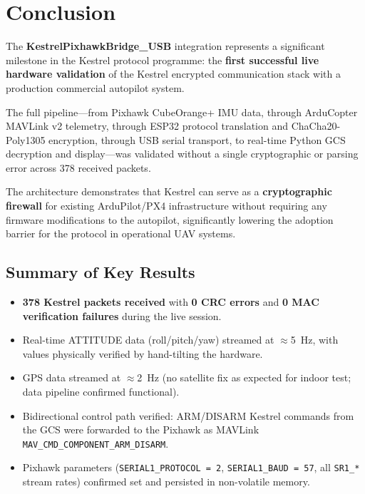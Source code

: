 \documentclass[11pt,a4paper]{article}
\begin{document}
\section{Conclusion}

The \textbf{KestrelPixhawkBridge\_USB} integration represents a significant
milestone in the Kestrel protocol programme: the \textbf{first successful
live hardware validation} of the Kestrel encrypted communication stack with
a production commercial autopilot system.

The full pipeline---from Pixhawk CubeOrange+ IMU data, through ArduCopter
MAVLink v2 telemetry, through ESP32 protocol translation and ChaCha20-Poly1305
encryption, through USB serial transport, to real-time Python GCS decryption
and display---was validated without a single cryptographic or parsing error
across 378 received packets.

The architecture demonstrates that Kestrel can serve as a \textbf{cryptographic
firewall} for existing ArduPilot/PX4 infrastructure without requiring any
firmware modifications to the autopilot, significantly lowering the adoption
barrier for the protocol in operational UAV systems.

\subsection*{Summary of Key Results}

\begin{itemize}
    \item \textbf{378 Kestrel packets received} with \textbf{0 CRC errors}
          and \textbf{0 MAC verification failures} during the live session.
    \item Real-time ATTITUDE data (roll/pitch/yaw) streamed at $\approx$5~Hz,
          with values physically verified by hand-tilting the hardware.
    \item GPS data streamed at $\approx$2~Hz (no satellite fix as expected
          for indoor test; data pipeline confirmed functional).
    \item Bidirectional control path verified: ARM/DISARM Kestrel commands
          from the GCS were forwarded to the Pixhawk as MAVLink
          \texttt{MAV\_CMD\_COMPONENT\_ARM\_DISARM}.
    \item Pixhawk parameters (\texttt{SERIAL1\_PROTOCOL = 2},
          \texttt{SERIAL1\_BAUD = 57}, all \texttt{SR1\_*} stream rates)
          confirmed set and persisted in non-volatile memory.
\end{itemize}
\end{document}
